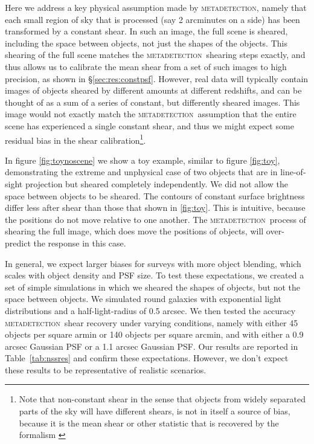 \documentclass[fleqn,useAMS,usenatbib]{mnras}
\newcommand{\mdet}{\textsc{metadetection}}
\begin{document}
Here we address a key physical assumption made by \mdet, namely that each small
region of sky that is processed (say 2 arcminutes on a side) has been
transformed by a constant shear.  In such an image, the full scene is sheared,
including the space between objects, not just the shapes of the objects. This
shearing of the full scene matches the \mdet\ shearing steps exactly, and thus
allows us to calibrate the mean shear from a set of such images to high
precision, as shown in \S \ref{sec:res:constpsf}.  However, real data will
typically contain images of objects sheared by different amounts at different
redshifts, and can be thought of as a sum of a series of constant, but
differently sheared images.  This image would not exactly match the \mdet\
assumption that the entire scene has experienced a single constant shear, and
thus we might expect some residual bias in the shear calibration\footnote{Note
that non-constant shear in the sense that objects from widely separated parts
of the sky will have different shears, is not in itself a source of bias,
because it is the mean shear or other statistic that is recovered by the
formalism \citep{SheldonMcal2017}}.

In figure \ref{fig:toynoscene} we show a toy example, similar to figure
\ref{fig:toy}, demonstrating the extreme and unphysical case of two objects
that are in line-of-sight projection but sheared completely independently.  We
did not allow the space between objects to be sheared. The contours of constant
surface brightness differ less after shear than those that shown in
\ref{fig:toy}.  This is intuitive, because the positions do not move relative
to one another.  The \mdet\ process of shearing the full image, which does move
the positions of objects, will over-predict the response in this case.

In general, we expect larger biases for surveys with more object blending,
which scales with object density and PSF size.  To test these expectations, we
created a set of simple simulations in which we sheared the shapes of objects,
but not the space between objects.  We simulated round galaxies with
exponential light distributions and a half-light-radius of 0.5 arcsec. We then
tested the accuracy \mdet\ shear recovery under varying conditions, namely with
either 45 objects per square armin or 140 objects per square arcmin, and with
either a 0.9 arcsec Gaussian PSF or a 1.1 arcsec Gaussian PSF. Our results are
reported in Table~\ref{tab:nssres} and confirm these expectations. However, we
don't expect these results to be representative of realistic scenarios.
\end{document}
